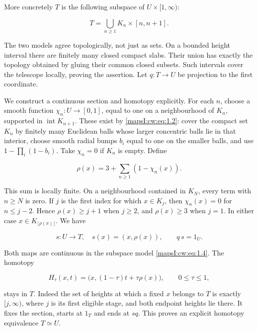 \documentclass[11pt]{article}
\begin{document}
More concretely \(T\) is the following subspace of \(U\times[1,\infty)\):

\begin{equation}
T=\bigcup_{n\geq1}K_n\times[n,n+1].
\label{mapsI:cw:eq:1.4}
\end{equation}

The two models agree topologically, not just as sets. On a bounded height interval there are finitely many closed compact slabs. Their union has exactly the topology obtained by gluing their common closed subsets. Such intervals cover the telescope locally, proving the assertion. Let \(q:T\to U\) be projection to the first coordinate.

We construct a continuous section and homotopy explicitly. For each \(n\), choose a smooth function \(\chi_n:U\to[0,1]\), equal to one on a neighbourhood of \(K_n\), supported in \(\operatorname{int}K_{n+1}\). These exist by \eqref{mapsI:cw:eq:1.2}: cover the compact set \(K_n\) by finitely many Euclidean balls whose larger concentric balls lie in that interior, choose smooth radial bumps \(b_i\) equal to one on the smaller balls, and use \(1-\prod_i(1-b_i)\). Take \(\chi_n=0\) if \(K_n\) is empty. Define

\begin{equation}
\rho(x)=3+\sum_{n\geq1}(1-\chi_n(x)).
\label{mapsI:cw:eq:1.5}
\end{equation}

This sum is locally finite. On a neighbourhood contained in \(K_N\), every term with \(n\geq N\) is zero. If \(j\) is the first index for which \(x\in K_j\), then \(\chi_n(x)=0\) for \(n\leq j-2\). Hence \(\rho(x)\geq j+1\) when \(j\geq2\), and \(\rho(x)\geq3\) when \(j=1\). In either case \(x\in K_{\lfloor\rho(x)\rfloor}\). We have

\begin{equation}
s:U\longrightarrow T,\quad s(x)=(x,\rho(x)),\qquad q\,s=1_U.
\label{mapsI:cw:eq:1.6}
\end{equation}

Both maps are continuous in the subspace model \eqref{mapsI:cw:eq:1.4}. The homotopy

\begin{equation}
H_\tau(x,t)=\bigl(x,(1-\tau)t+\tau\rho(x)\bigr),
\qquad 0\leq\tau\leq1,
\label{mapsI:cw:eq:1.7}
\end{equation}

stays in \(T\). Indeed the set of heights at which a fixed \(x\) belongs to \(T\) is exactly \([j,\infty)\), where \(j\) is its first eligible stage, and both endpoint heights lie there. It fixes the section, starts at \(1_T\) and ends at \(s q\). This proves an explicit homotopy equivalence \(T\simeq U\).
\end{document}

